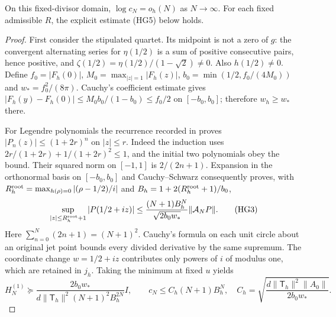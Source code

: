 \documentclass[11pt]{article}
\begin{document}
\begin{hgtheorem}
On this fixed-divisor domain, $\log c_N=o_h(N)$ as $N\to\infty$.
For each fixed admissible $R$, the explicit estimate (HG5) below holds.
\end{hgtheorem}
\begin{proof}
First consider the stipulated quartet. Its midpoint is not a zero of
$g$: the convergent alternating series for $\eta(1/2)$ is a sum of
positive consecutive pairs, hence positive, and
$\zeta(1/2)=\eta(1/2)/(1-\sqrt2)\ne0$. Also $h(1/2)\ne0$.
Define $f_0=|F_h(0)|$, $M_0=\max_{|z|=1}|F_h(z)|$,
$b_0=\min(1/2,f_0/(4M_0))$ and $w_*=f_0^2/(8\pi)$.
Cauchy's coefficient estimate gives
$|F_h(y)-F_h(0)|\le M_0b_0/(1-b_0)\le f_0/2$ on $[-b_0,b_0]$;
therefore $w_h\ge w_*$ there.

For Legendre polynomials the recurrence recorded in
\cite[Table 18.9.1]{hg:DLMF18} proves
$|P_n(z)|\le(1+2r)^n$ on $|z|\le r$. Indeed the induction uses
$2r/(1+2r)+1/(1+2r)^2\le1$, and the initial two polynomials obey
the bound. Their squared norm on $[-1,1]$ is $2/(2n+1)$.
Expansion in the orthonormal basis on $[-b_0,b_0]$ and
Cauchy--Schwarz consequently proves, with
$R_h^{\rm root}=\max_{h(\rho)=0}|(\rho-1/2)/i|$ and
$B_h=1+2(R_h^{\rm root}+1)/b_0$,
\[
 \sup_{|z|\le R_h^{\rm root}+1}|P(1/2+iz)|
 \le\frac{(N+1)B_h^N}{\sqrt{2b_0w_*}}\|\mathcal A_NP\|.
 \tag{HG3}
\]
Here $\sum_{n=0}^N(2n+1)=(N+1)^2$. Cauchy's formula on each
unit circle about an original jet point bounds every divided derivative
by the same supremum. The coordinate change $w=1/2+iz$ contributes
only powers of $i$ of modulus one, which are retained in $j_h$.
Taking the minimum at fixed $u$ yields
\[
 H_N^{(1)}\succeq
 \frac{2b_0w_*}{d\|\mathsf T_h\|^2(N+1)^2B_h^{2N}}I,
 \qquad c_N\le C_h(N+1)B_h^N,
 \quad C_h=\sqrt{\frac{d\|\mathsf T_h\|^2\|A_0\|}{2b_0w_*}}.
 \tag{HG4}
\]


\end{proof}
\end{document}
